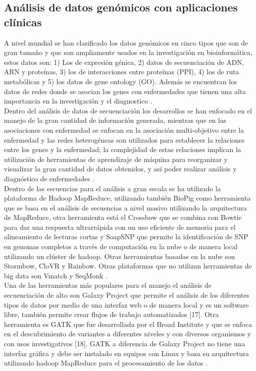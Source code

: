 {\subsection{Análisis de datos genómicos con aplicaciones clínicas}

A nivel mundial se han clasificado los datos genómicos en cinco tipos que son de gran tamaño y que son ampliamente usados en la investigación en bioinformática, estos datos son: 1) Los de expresión génica, 2) datos de secuenciación de ADN, ARN y proteínas, 3) los de interacciones entre proteínas (PPI), 4) los de ruta metabólicas y 5) los datos de gene ontology (GO). Además se encuentran los datos de redes donde se asocian los genes con enfermedades que tienen una alta importancia en la investigación y el diagnostico \cite{Kashyap2015}.\\

Dentro del análisis de datos de secuenciación los desarrollos se han enfocado en el manejo de la gran cantidad de información generada, mientras que en las asociaciones con enfermedad se enfocan en la asociación multi-objetivo entre la enfermedad  y las redes heterogéneas son utilizados para establecer la relaciones entre los genes y la enfermedad; la complejidad de estas relaciones implican la utilización de herramientas de aprendizaje de máquina para reorganizar y visualizar la gran cantidad de datos obtenidos, y así poder realizar análisis y diagnóstico de enfermedades \cite{Kashyap2015}. \\

Dentro de las secuencias para el análisis a gran escala se ha utilizado la plataforma de Hadoop MapReduce, utilizando también BioPig  como herramienta que se basa en el análisis de secuencias a nivel masivo utilizando la arquitectura de MapReduce, otra herramienta está el Crossbow que se combina con Bowtie para dar una respuesta ultrarrápida con un uso eficiente de memoria para el alineamiento de lecturas cortas y SoapSNP que permite la identificación de SNP en genomas completos a través de computación en la nube o de manera local utilizando un clúster de hadoop. Otras herramientas basadas en la nube son Stormbow, CloVR y Rainbow. Otras plataformas que no utilizan herramientas de big data son Vmatch y SeqMonk \cite{Kashyap2015}.\\

Una de las herramientas más populares para el manejo el análisis de secuenciación de alto son Galaxy Project que permite el análisis de los diferentes tipos de datos por medio de una interfaz web o de manera local y es un software libre, también permite crear flujos de trabajo automatizados [17]. Otra herramienta es GATK que fue desarrollada por el Broad Institute y que se enfoca en el descubrimiento de variantes  a diferentes niveles y con diversos organismos y con usos investigativos [18]. GATK a diferencia de Galaxy Project no tiene una interfaz gráfica y debe ser instalado en equipos con Linux y basa su arquitectura utilizando hadoop MapReduce para el procesamiento de los datos \cite{Maharjan2011} .\\

}
